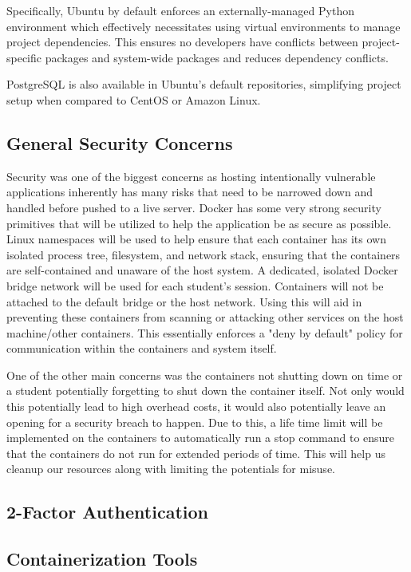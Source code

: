 \documentclass[12pt]{article}
\begin{document}
Specifically, Ubuntu by default enforces an externally-managed Python environment which effectively necessitates using virtual environments to manage project dependencies. This ensures no developers have conflicts between project-specific packages and system-wide packages and reduces dependency conflicts.

PostgreSQL is also available in Ubuntu's default repositories, simplifying project setup when compared to CentOS or Amazon Linux.

\subsection{General Security Concerns}
Security was one of the biggest concerns as hosting intentionally vulnerable applications inherently has many risks that need to be narrowed down and handled before pushed to a live server. Docker has some very strong security primitives that will be utilized to help the application be as secure as possible. Linux namespaces will be used to help ensure that each container has its own isolated process tree, filesystem, and network stack, ensuring that the containers are self-contained and unaware of the host system. A dedicated, isolated Docker bridge network will be used for each student's session. Containers will not be attached to the default bridge or the host network. Using this will aid in preventing these containers from scanning or attacking other services on the host machine/other containers. This essentially enforces a "deny by default" policy for communication within the containers and system itself.

One of the other main concerns was the containers not shutting down on time or a student potentially forgetting to shut down the container itself. Not only would this potentially lead to high overhead costs, it would also potentially leave an opening for a security breach to happen. Due to this, a life time limit will be implemented on the containers to automatically run a stop command to ensure that the containers do not run for extended periods of time. This will help us cleanup our resources along with limiting the potentials for misuse.

\subsection{2-Factor Authentication}


\subsection{Containerization Tools}
\end{document}
